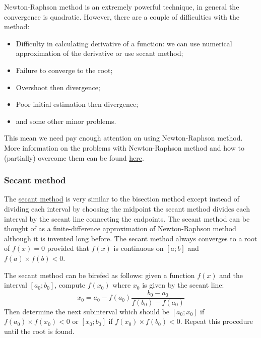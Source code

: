 Newton-Raphson method is an extremely powerful technique, in general the convergence is quadratic. However, there are a couple of difficulties with the method:
\begin{itemize}
	\setlength\itemsep{0em}
	\item Difficulty in calculating derivative of a function: we can use numerical approximation of the derivative or use secant method;
	\item Failure to converge to the root;
	\item Overshoot then divergence;
	\item Poor initial estimation then divergence;
	\item and some other minor problems. 
\end{itemize}
This mean we need pay enough attention on using Newton-Raphson method. More information on the problems with Newton-Raphson method and how to (partially) overcome them can be found \href{https://en.wikipedia.org/wiki/Newton's_method}{here}.



\subsubsection{Secant method}
The \href{https://en.wikipedia.org/wiki/Secant_method}{secant method} is very similar to the bisection method except instead of dividing each interval by choosing the midpoint the secant method divides each interval by the secant line connecting the endpoints. The secant method can be thought of as a finite-difference approximation of Newton-Raphson method although it is invented long before. The secant method always converges to a root of $f(x) = 0$ provided that $f(x)$ is continuous on $[a;b]$ and $f(a) \times f(b) < 0$.

The secant method can be birefed as follows: given a function $f(x)$ and the interval $[a_0; b_0]$, compute $f(x_0)$ where $x_0$ is given by the secant line:
\begin{equation}
	x_0 = a_0 - f(a_0) \frac{b_0 - a_0}{f(b_0) - f(a_0)}
\end{equation}
Then determine the next subinterval which should be $[a_0; x_0]$ if $f(a_0) \times f(x_0) < 0$ or $[x_0; b_0]$ if $f(x_0) \times f(b_0) < 0$. Repeat this procedure until the root is found. 
\\

